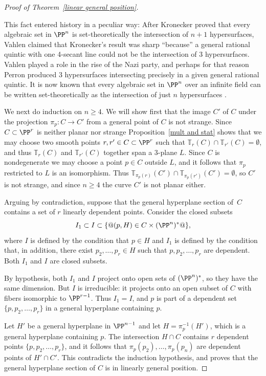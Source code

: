 \begin{proof}[Proof of Theorem~\ref{linear general position}]
\begin{fact}
 This fact entered history in a peculiar way:
 After Kronecker \citeyear{Kronecker} proved that every algebraic set in
  $\PP^{n}$ is set-theoretically the intersection of $n+1$
%
%
%
%
  hypersurfaces,
Vahlen \citeyear{Vahlen} claimed that Kronecker's result was
  sharp ``because'' a general
rational quintic
%
with one 4-secant line
  could not be the intersection of 3 hypersurfaces.
  Vahlen played a role in the rise of the Nazi party, and perhaps for
  that reason
Perron \citeyear{Perron} produced 3 hypersurfaces intersecting
%
  precisely in a given general rational quintic. It is now known that
  every algebraic set in
  $\PP^{n}$ over an infinite field can be written set-theoretically as
  the intersection of just $n$ hypersurfaces \cite{Eisenbud-Evans}.
\end{fact}

We next do induction on $n\geq 4$. We will show first that the image
$C'$ of
$C$ under the projection $\pi_p: C\to C'$ from a general point of $C$
is not strange. Since $C\subset \PP^r$ is neither
planar nor strange
Proposition~\ref{mult and stat} shows that we may choose two smooth points
$r,r'\in C\subset \PP^r$ such that ${\mathbb T}_r(C)\cap {\mathbb T}_{r'}(C) = \emptyset$,
and thus
${\mathbb T}_r(C)$ and ${\mathbb T}_{r'}(C)$ together span a 3-plane $L$. Since $C$ is
nondegenerate we may
choose a point $p\in C$ outside $L$, and it follows that $\pi_p$
restricted to $L$ is an isomorphism.
Thus ${\mathbb T}_{\pi_p(r)}(C') \cap {\mathbb T}_{\pi_p({r'})}(C') = \emptyset$, so $C'$
is not strange,
and since $n\geq 4$ the curve $C'$ is not planar either.

Arguing by contradiction, suppose that the general hyperplane section
of~$C$ contains a set of $r$ linearly dependent points. Consider the
closed subsets
$$
I_1 \subset I \subset \{@(p,H) \in C \times (\PP^n)^*@\}
,
$$
where $I$ is defined by the
condition
that $p\in H$ and $I_1$ is defined
by the condition that, in addition, there exist $p_2,\dots, p_r\in H$
such that $p, p_2, \dots, p_r$ are dependent. Both $I_1$ and $I$ are
closed subsets.

By hypothesis, both $I_1$ and $I$ project onto open sets of $(\PP^n)^*$,
so they have the same dimension.
But $I$ is irreducible: it projects onto an open subset of $C$ with
fibers isomorphic to $\PP^{r-1}$. Thus $I_1 = I$,
and  $p$ is part of a dependent set
$\{p, p_2,\dots, p_r\}$ in a general hyperplane containing $p$.

Let $H'$ be a general hyperplane in $\PP^{n-1}$
and let $H = \pi_p^{-1}(H')$, which is a general hyperplane containing
$p$. The intersection $H\cap C$
contains $r$ dependent points $\{p, p_2,\dots, p_r\}$, and it follows
that $\pi_p(p_2),\dots,\pi_p(p_n)$
are dependent points of $H'\cap C'$. This contradicts the induction
hypothesis, and proves that
the general hyperplane section of $C$ is in linearly general position.
\end{proof}

